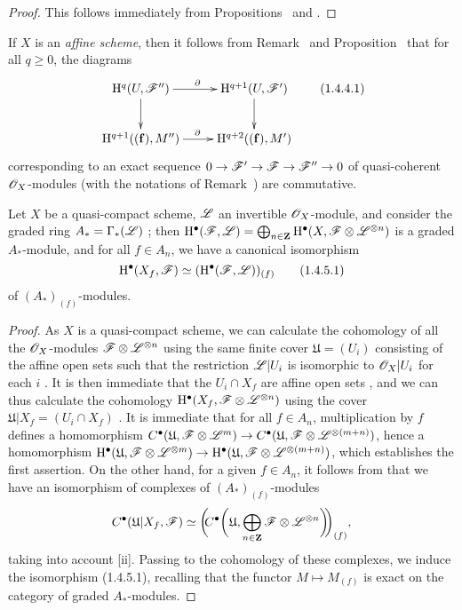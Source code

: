 \begin{proof}
\label{proof-3.1.4.3}
This follows immediately from Propositions~ and .
\end{proof}

\begin{env}[1.4.4]
\label{3.1.4.4}
If $X$ is an \emph{affine scheme}, then it follows from Remark~ and Proposition~ that for all $q\geq 0$, the diagrams
\[
  \xymatrix{
    \HH^q(U,\sh{F}'')\ar[r]^\partial\ar[d] &
    \HH^{q+1}(U,\sh{F}')\ar[d]\\
    \HH^{q+1}((\mathbf{f}),M'')\ar[r]^\partial &
    \HH^{q+2}((\mathbf{f}),M')
  }
  \tag{1.4.4.1}
\]
corresponding to an exact sequence $0\to\sh{F}'\to\sh{F}\to\sh{F}''\to 0$ of quasi-coherent $\mathscr{O}_X$-modules (with the notations of Remark~) are commutative.
\end{env}

\begin{proposition}[1.4.5]
\label{3.1.4.5}
Let $X$ be a quasi-compact scheme, $\mathscr{L}$ an invertible $\mathscr{O}_X$-module, and consider the graded ring $A_*=\Gamma_*(\mathscr{L})$ ; then $\mathrm{H}^\bullet(\mathscr{F},\mathscr{L})=\bigoplus_{n\in\mathbf{Z}}\mathrm{H}^\bullet(X,\mathscr{F}\otimes\mathscr{L}^{\otimes n})$ is a graded $A_*$-module, and for all $f\in A_n$, we have a canonical isomorphism
\[
  \mathrm{H}^\bullet(X_f,\mathscr{F})\simeq(\mathrm{H}^\bullet(\mathscr{F},\mathscr{L}))_{(f)}
  \tag{1.4.5.1}
\]
of $(A_*)_{(f)}$-modules.
\end{proposition}

\begin{proof}
\label{proof-3.1.4.5}
As $X$ is a quasi-compact scheme, we can calculate the cohomology of all the $\mathscr{O}_X$-modules $\mathscr{F}\otimes\mathscr{L}^{\otimes n}$ using the same finite cover $\mathfrak{U}=(U_i)$ consisting of the affine open sets such that the restriction $\mathscr{L}|U_i$ is isomorphic to $\mathscr{O}_X|U_i$ for each $i$ .
It is then immediate that the $U_i\cap X_f$ are affine open sets , and we can thus calculate the cohomology $\mathrm{H}^\bullet(X_f,\mathscr{F}\otimes\mathscr{L}^{\otimes n})$ using the cover $\mathfrak{U}|X_f=(U_i\cap X_f)$ .
It is immediate that for all $f\in A_n$, multiplication by $f$ defines a homomorphism $C^\bullet(\mathfrak{U},\sh{F}\otimes\sh{L}^m)\to C^\bullet(\mathfrak{U},\sh{F}\otimes\sh{L}^{\otimes(m+n)})$, hence a homomorphism $\HH^\bullet(\mathfrak{U},\sh{F}\otimes\sh{L}^{\otimes m})\to\HH^\bullet(\mathfrak{U},\sh{F}\otimes\sh{L}^{\otimes(m+n)})$, which establishes the first assertion.
On the other hand, for a given $f\in A_n$, it follows from  that we have an isomorphism of complexes of $(A_*)_{(f)}$-modules
\[
  C^\bullet(\mathfrak{U}|X_f,\mathscr{F})\simeq\bigg(\!\!C^\bullet\bigg(\mathfrak{U},\bigoplus_{n\in\mathbf{Z}}\mathscr{F}\otimes\mathscr{L}^{\otimes n}\bigg)\!\!\bigg)_{(f)},
\]
taking into account [ii].
Passing to the cohomology of these complexes, we induce the isomorphism (1.4.5.1), recalling that the functor $M\mapsto M_{(f)}$ is exact on the category of graded $A_*$-modules.
\end{proof}

